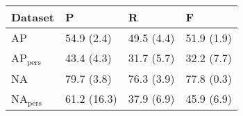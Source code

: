 \begin{tabular}{llll}
	\toprule
    \textbf{Dataset} & \textbf{P} & \textbf{R} & \textbf{F} \\
    \midrule
    AP & 54.9 (2.4) & 49.5 (4.4) & 51.9 (1.9) \\
    AP$_{\text{pers}}$ & 43.4 (4.3) & 31.7 (5.7) & 32.2 (7.7) \\
    NA & 79.7 (3.8) & 76.3 (3.9) & 77.8 (0.3) \\
    NA$_{\text{pers}}$ & 61.2 (16.3) & 37.9 (6.9) & 45.9 (6.9) \\
    \bottomrule
\end{tabular}